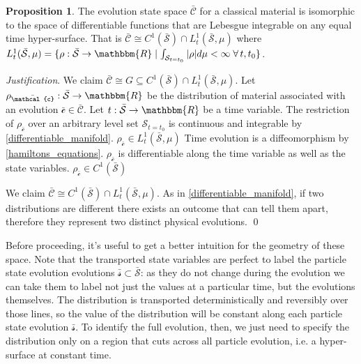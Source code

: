 \documentclass[aps,pra,10pt,twocolumn,floatfix,nofootinbib]{revtex4-1}
\numberwithin{equation}{section}
\theoremstyle{definition}
\newtheorem{prop}[equation]{Proposition}
\newenvironment{justification}{\emph{Justification}.}{\qed}
\begin{document}
\begin{prop}\label{material_evolution_state_space}
	The evolution state space $\bar{\mathcal{C}}$ for a classical material is isomorphic to the space of differentiable functions that are Lebesgue integrable on any equal time hyper-surface. That is $\bar{\mathcal{C}} \cong  C^1(\bar{\mathcal{S}})\cap L^1_t(\bar{\mathcal{S}}, \mu)$ where $L^1_t(\bar{\mathcal{S}}, \mu)=\{{\rho: \bar{\mathcal{S}} \rightarrow \mathbbm{R}} \; | \; {\int_{\mathcal{S}_{t=t_0}} |\rho| d\mu < \infty} \; \forall \, t, t_0 \}$.
\end{prop}

\begin{justification}
	We claim $\bar{\mathcal{C}} \cong  G \subseteq C^1(\bar{\mathcal{S}})\cap L^1_t(\bar{\mathcal{S}}, \mu)$. Let $\rho_{\bar{\mathcal{c}}} : \bar{\mathcal{S}} \rightarrow \mathbbm{R}$ be the distribution of material associated with an evolution $\bar{\mathcal{c}} \in \bar{\mathcal{C}}$. Let $t : \bar{\mathcal{S}} \rightarrow \mathbbm{R}$ be a time variable. 
	The restriction of $\rho_{\bar{\mathcal{c}}}$ over an arbitrary level set $\mathcal{S}_{t=t_0}$ is continuous and integrable by \ref{differentiable_manifold}. $\rho_{\bar{\mathcal{c}}} \in L^1_t(\bar{\mathcal{S}}, \mu)$ Time evolution is a diffeomorphism by \ref{hamiltons_equations}. $\rho_{\bar{\mathcal{c}}}$ is differentiable along the time variable as well as the state variables. $\rho_{\bar{\mathcal{c}}} \in C^1(\bar{\mathcal{S}})$
	
	We claim $\bar{\mathcal{C}} \cong  C^1(\bar{\mathcal{S}})\cap L^1_t(\bar{\mathcal{S}}, \mu)$. As in \ref{differentiable_manifold}, if two distributions are different there exists an outcome that can tell them apart, therefore they represent two distinct physical evolutions.
\end{justification}

Before proceeding, it's useful to get a better intuition for the geometry of these space. Note that the transported state variables are perfect to label the particle state evolution evolutions $\bar{\mathcal{s}} \subset \bar{\mathcal{S}}$: as they do not change during the evolution we can take them to label not just the values at a particular time, but the evolutions themselves. The distribution is transported deterministically and reversibly over those lines, so the value of the distribution will be constant along each particle state evolution $\bar{\mathcal{s}}$. To identify the full evolution, then, we just need to specify the distribution only on a region that cuts across all particle evolution, i.e. a hyper-surface at constant time.
\end{document}
